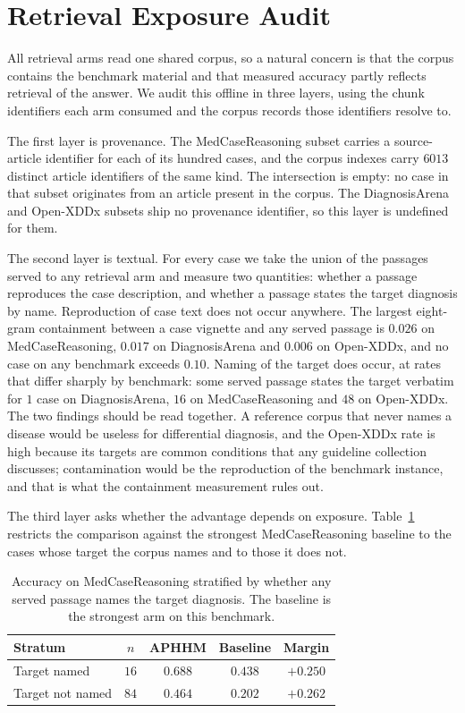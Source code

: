 \documentclass[letterpaper]{article}
\begin{document}
\section{Retrieval Exposure Audit}
\label{sec:exposure}

All retrieval arms read one shared corpus, so a natural concern is that the corpus contains the benchmark material and that measured accuracy partly reflects retrieval of the answer.
We audit this offline in three layers, using the chunk identifiers each arm consumed and the corpus records those identifiers resolve to.

The first layer is provenance.
The MedCaseReasoning subset carries a source-article identifier for each of its hundred cases, and the corpus indexes carry $6013$ distinct article identifiers of the same kind.
The intersection is empty: no case in that subset originates from an article present in the corpus.
The DiagnosisArena and Open-XDDx subsets ship no provenance identifier, so this layer is undefined for them.

The second layer is textual.
For every case we take the union of the passages served to any retrieval arm and measure two quantities: whether a passage reproduces the case description, and whether a passage states the target diagnosis by name.
Reproduction of case text does not occur anywhere.
The largest eight-gram containment between a case vignette and any served passage is $0.026$ on MedCaseReasoning, $0.017$ on DiagnosisArena and $0.006$ on Open-XDDx, and no case on any benchmark exceeds $0.10$.
Naming of the target does occur, at rates that differ sharply by benchmark: some served passage states the target verbatim for $1$ case on DiagnosisArena, $16$ on MedCaseReasoning and $48$ on Open-XDDx.
The two findings should be read together.
A reference corpus that never names a disease would be useless for differential diagnosis, and the Open-XDDx rate is high because its targets are common conditions that any guideline collection discusses; contamination would be the reproduction of the benchmark instance, and that is what the containment measurement rules out.

The third layer asks whether the advantage depends on exposure.
Table~\ref{tab:exposure} restricts the comparison against the strongest MedCaseReasoning baseline to the cases whose target the corpus names and to those it does not.

\begin{table}[tb]
\centering
\footnotesize
\setlength{\tabcolsep}{4pt}
\begin{tabular}{@{}lcccc@{}}
\toprule
Stratum & $n$ & APHHM & Baseline & Margin \\
\midrule
Target named    & $16$ & $0.688$ & $0.438$ & $+0.250$ \\
Target not named & $84$ & $0.464$ & $0.202$ & $+0.262$ \\
\bottomrule
\end{tabular}
\caption{Accuracy on MedCaseReasoning stratified by whether any served passage names the target diagnosis. The baseline is the strongest arm on this benchmark.}
\label{tab:exposure}
\end{table}
\end{document}
